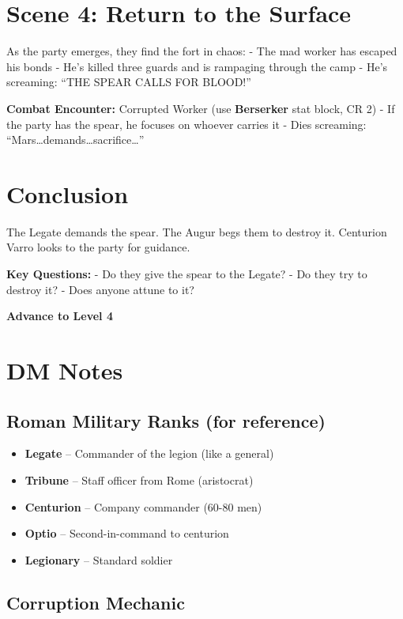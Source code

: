 \documentclass[
]{book}
\providecommand{\tightlist}{%
  \setlength{\itemsep}{0pt}\setlength{\parskip}{0pt}}
\begin{document}
\section{Scene 4: Return to the
Surface}\label{scene-4-return-to-the-surface}

As the party emerges, they find the fort in chaos: - The mad worker has
escaped his bonds - He's killed three guards and is rampaging through
the camp - He's screaming: ``THE SPEAR CALLS FOR BLOOD!''

\textbf{Combat Encounter:} Corrupted Worker (use \textbf{Berserker} stat
block, CR 2) - If the party has the spear, he focuses on whoever carries
it - Dies screaming: ``Mars\ldots demands\ldots sacrifice\ldots{}''

\section{Conclusion}\label{conclusion}

The Legate demands the spear. The Augur begs them to destroy it.
Centurion Varro looks to the party for guidance.

\textbf{Key Questions:} - Do they give the spear to the Legate? - Do
they try to destroy it? - Does anyone attune to it?

\textbf{Advance to Level 4}

\section{DM Notes}\label{dm-notes}

\subsection{Roman Military Ranks (for
reference)}\label{roman-military-ranks-for-reference}

\begin{itemize}
\tightlist
\item
  \textbf{Legate} -- Commander of the legion (like a general)
\item
  \textbf{Tribune} -- Staff officer from Rome (aristocrat)
\item
  \textbf{Centurion} -- Company commander (60-80 men)
\item
  \textbf{Optio} -- Second-in-command to centurion
\item
  \textbf{Legionary} -- Standard soldier
\end{itemize}

\subsection{Corruption Mechanic}\label{corruption-mechanic}
\end{document}
